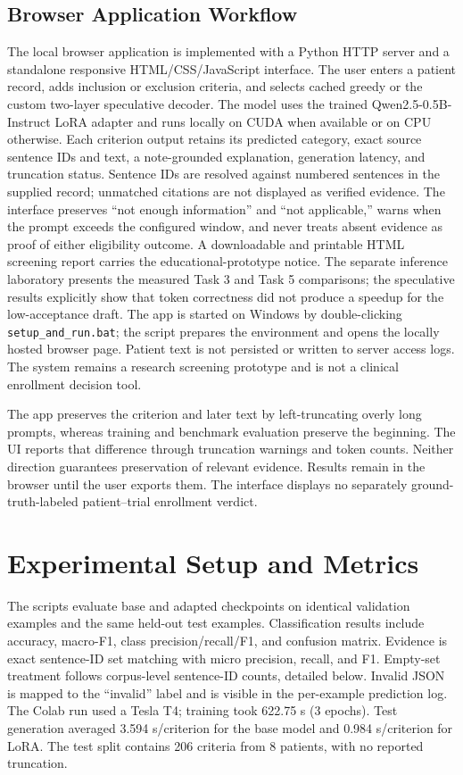 \documentclass[conference]{IEEEtran}
\begin{document}
\subsection{Browser Application Workflow}

The local browser application is implemented with a Python HTTP server and a standalone responsive HTML/CSS/JavaScript interface. The user enters a patient record, adds inclusion or exclusion criteria, and selects cached greedy or the custom two-layer speculative decoder. The model uses the trained Qwen2.5-0.5B-Instruct LoRA adapter and runs locally on CUDA when available or on CPU otherwise. Each criterion output retains its predicted category, exact source sentence IDs and text, a note-grounded explanation, generation latency, and truncation status. Sentence IDs are resolved against numbered sentences in the supplied record; unmatched citations are not displayed as verified evidence. The interface preserves ``not enough information'' and ``not applicable,'' warns when the prompt exceeds the configured window, and never treats absent evidence as proof of either eligibility outcome. A downloadable and printable HTML screening report carries the educational-prototype notice. The separate inference laboratory presents the measured Task 3 and Task 5 comparisons; the speculative results explicitly show that token correctness did not produce a speedup for the low-acceptance draft. The app is started on Windows by double-clicking \texttt{setup\_and\_run.bat}; the script prepares the environment and opens the locally hosted browser page. Patient text is not persisted or written to server access logs. The system remains a research screening prototype and is not a clinical enrollment decision tool.

The app preserves the criterion and later text by left-truncating overly long prompts, whereas training and benchmark evaluation preserve the beginning. The UI reports that difference through truncation warnings and token counts. Neither direction guarantees preservation of relevant evidence. Results remain in the browser until the user exports them. The interface displays no separately ground-truth-labeled patient--trial enrollment verdict.
\section{Experimental Setup and Metrics}

The scripts evaluate base and adapted checkpoints on identical validation examples and the same held-out test examples. Classification results include accuracy, macro-F1, class precision/recall/F1, and confusion matrix. Evidence is exact sentence-ID set matching with micro precision, recall, and F1. Empty-set treatment follows corpus-level sentence-ID counts, detailed below. Invalid JSON is mapped to the “invalid” label and is visible in the per-example prediction log. The Colab run used a Tesla T4; training took 622.75 s (3 epochs). Test generation averaged 3.594 s/criterion for the base model and 0.984 s/criterion for LoRA. The test split contains 206 criteria from 8 patients, with no reported truncation.
\end{document}
